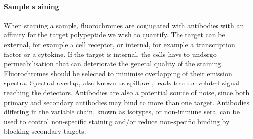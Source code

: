 \paragraph{Sample staining} 
When staining a sample, fluorochromes are conjugated with antibodies with an affinity for the target polypeptide we wish to quantify.
The target can be external, for example a cell receptor, or internal, for example a transcription factor or a cytokine.
If the target is internal, the cells have to undergo permeabilisation that can deteriorate the general quality of the staining.
Fluorochromes should be selected to minimise overlapping of their emission spectra.
Spectral overlap, also known as spillover, leads to a convoluted signal reaching the detectors.
Antibodies are also a potential source of noise, since both primary and secondary antibodies may bind to more than one target.
Antibodies differing in the variable chain, known as isotypes, or non-immune sera, can be used to control non-specific staining and/or reduce non-specific binding by blocking secondary targets.


